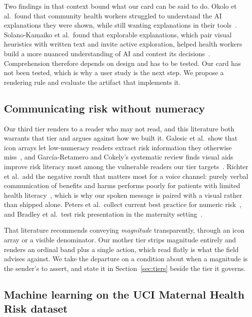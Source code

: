 Two findings in that context bound what our card can be said to do. Okolo
et al.\ found that community health workers struggled to understand the AI
explanations they were shown, while still wanting explanations in their
tools~\citep{okolo2024easy}. Solano-Kamaiko et al.\ found that explorable
explanations, which pair visual heuristics with written text and invite active
exploration, helped health workers build a more nuanced understanding of AI
and contest its decisions~\citep{solanokamaiko2024explorable}. Comprehension
therefore depends on design and has to be tested. Our card has not been
tested, which is why a user study is the next step. We propose a rendering
rule and evaluate the artifact that implements it.

\subsection{Communicating risk without numeracy}
\label{sec:rw-riskcomm}

Our third tier renders to a reader who may not read, and this literature both
warrants that tier and argues against how we built it. Galesic et al.\ show
that icon arrays let low-numeracy readers extract risk information they
otherwise miss~\citep{galesic2009icon}, and Garc\'{i}a-Retamero and Cokely's
systematic review finds visual aids improve risk literacy most among the
vulnerable readers our tier targets~\citep{garciaretamero2017visual}. Richter
et al.\ add the negative result that matters most for a voice channel: purely
verbal communication of benefits and harms performs poorly for patients with
limited health literacy~\citep{richter2023communication}, which is why our
spoken message is paired with a visual rather than shipped alone. Peters et
al.\ collect current best practice for numeric risk~\citep{peters2025numeric},
and Bradley et al.\ test risk presentation in the maternity
setting~\citep{bradley2025birth}.

That literature recommends conveying \emph{magnitude} transparently, through
an icon array or a visible denominator. Our mother tier strips magnitude
entirely and renders an ordinal band plus a single action, which read flatly
is what the field advises against. We take the departure on a condition about
when a magnitude is the sender's to assert, and state it in
Section~\ref{sec:tiers} beside the tier it governs.

\subsection{Machine learning on the UCI Maternal Health Risk dataset}
\label{sec:rw-dataset}

